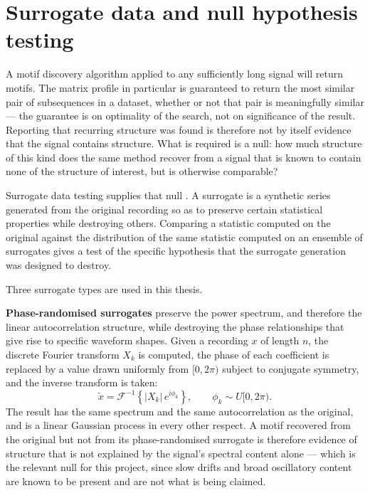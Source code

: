 \section{Surrogate data and null hypothesis testing}
\label{sec:surrogates}

A motif discovery algorithm applied to any sufficiently long signal will return motifs. The matrix profile in particular is guaranteed to return the most similar pair of subsequences in a dataset, whether or not that pair is meaningfully similar --- the guarantee is on optimality of the search, not on significance of the result. Reporting that recurring structure was found is therefore not by itself evidence that the signal contains structure. What is required is a null: how much structure of this kind does the same method recover from a signal that is known to contain none of the structure of interest, but is otherwise comparable?

Surrogate data testing supplies that null \cite{theiler1992surrogate}. A surrogate is a synthetic series generated from the original recording so as to preserve certain statistical properties while destroying others. Comparing a statistic computed on the original against the distribution of the same statistic computed on an ensemble of surrogates gives a test of the specific hypothesis that the surrogate generation was designed to destroy.

Three surrogate types are used in this thesis.

\textbf{Phase-randomised surrogates} preserve the power spectrum, and therefore the linear autocorrelation structure, while destroying the phase relationships that give rise to specific waveform shapes. Given a recording $x$ of length $n$, the discrete Fourier transform $X_k$ is computed, the phase of each coefficient is replaced by a value drawn uniformly from $[0, 2\pi)$ subject to conjugate symmetry, and the inverse transform is taken:
\begin{equation}
\tilde{x} = \mathcal{F}^{-1}\!\left\{ |X_k| \, e^{i\phi_k} \right\}, \qquad \phi_k \sim U[0,2\pi).
\end{equation}
The result has the same spectrum and the same autocorrelation as the original, and is a linear Gaussian process in every other respect. A motif recovered from the original but not from its phase-randomised surrogate is therefore evidence of structure that is not explained by the signal's spectral content alone --- which is the relevant null for this project, since slow drifts and broad oscillatory content are known to be present and are not what is being claimed.


